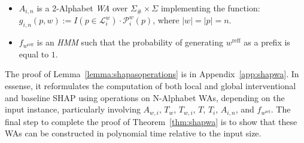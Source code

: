 \begin{lemma}
\begin{itemize}
        \item $A_{i,n}$ is a 2-Alphabet \emph{WA} over $\Sigma_{\#} \times \Sigma$ implementing the function:
         $g_{i,n}(p,w) := I(p \in \mathcal{L}_{i}^{w}) \cdot \mathcal{P}_{i}^{w}(p)$,
         where $|w| = |p| = n$.
       \item $f_{w^{\text{reff}}}$ is an \emph{HMM} such that the probability of generating $w^{\text{reff}}$ as a prefix is equal to $1$.
    \end{itemize}
\end{lemma}



The proof of Lemma~\ref{lemma:shapasoperations} is in Appendix~\ref{app:shapwa}. In essense, it reformulates the computation of both local and global interventional and baseline SHAP using operations on N-Alphabet WAs, depending on the input instance, particularly involving $A_{w,i}$, $T_{w}$, $T_{w,i}$, $T$, $T_{i}$, $A_{i,n}$, and $f_{w^{\text{ref}}}$. The final step to complete the proof of Theorem~\ref{thm:shapwa} is to show that these WAs can be constructed in polynomial time relative to the input size.






